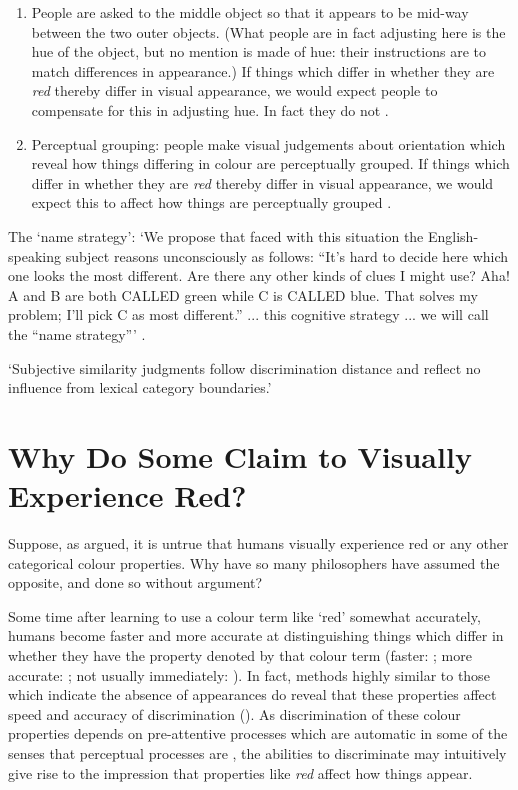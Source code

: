 \documentclass[12pt]{extarticle}
\begin{document}
\begin{multicols*}{3}
\begin{enumerate}
\item People are asked to the middle object so that it appears to be mid-way
between the two outer objects. (What people are in fact adjusting here is
the hue of the object, but no mention is made of hue: their instructions
are to match differences in appearance.) If things which differ in whether
they are \emph{red} thereby differ in visual appearance, we would expect
people to compensate for this in adjusting hue. In fact they do not
\citep{witzel2014category}.

\item Perceptual grouping: people make visual judgements about orientation which
reveal how things differing in colour are perceptually grouped.  If things which differ in whether
they are \emph{red} thereby differ in visual appearance, we would expect
this to affect how things are perceptually grouped \citet{webster:2012_color}.

\end{enumerate}

The ‘name strategy’: ‘We propose that faced with this situation the
English-speaking subject reasons
unconsciously as follows: “It's hard to decide here which one looks the most
different. Are there any other kinds of clues I might use? Aha! A and B are
both CALLED green while C is CALLED blue. That solves my problem; I'll pick C
as most different.” ... this cognitive strategy ... we will call the
“name strategy”’ \citep[p.~72]{kay_what_1984}.

‘Subjective similarity judgments follow
discrimination distance and reflect no influence from lexical category
boundaries.’ \citep[p.~73]{kay_what_1984}



\section{Why Do Some Claim to Visually Experience Red?}

Suppose, as argued, it is untrue that humans visually experience red or any
other categorical colour properties.
Why have so many philosophers have assumed the opposite, and done so without argument?

Some time after learning to use a colour term like ‘red’
somewhat accurately, humans become faster and more accurate at
distinguishing things which differ in whether they have the property
denoted by that colour term (faster: \citealp{Bornstein:1984cb}; more
accurate: \citealp[p.\ 22--7]{Roberson:1999rk}; not usually immediately:
\citealp{Franklin:2005hp}). In fact, methods highly similar to those which
indicate the absence of appearances do reveal that these properties affect
speed and accuracy of discrimination (\citealp{witzel:2014_categorical}).
As discrimination of these colour properties depends on pre-attentive
processes which are automatic in some of the senses that perceptual
processes are \citep{Daoutis:2006ij,clifford_color_2010}, the abilities to
discriminate may intuitively give rise to the impression that properties
like \emph{red} affect how things appear.






\end{multicols*}
\end{document}
